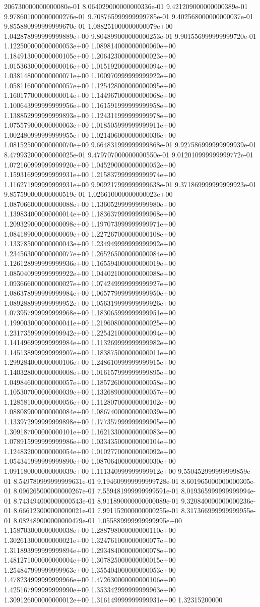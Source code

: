206730000000000080e-01	8.064029000000000336e-01	9.421209000000000389e-01	9.978601000000000276e-01	9.708765999999999785e-01	9.402568000000000037e-01	9.855880999999999670e-01	1.088251000000000079e+00	1.042878999999999889e+00	9.804899000000000253e-01	9.901556999999999720e-01	1.122500000000000053e+00	1.089814000000000060e+00	1.184913000000000105e+00	1.206423000000000023e+00	1.015363000000000016e+00	1.015192000000000094e+00	1.038148000000000071e+00	1.100970999999999922e+00	1.058116000000000057e+00	1.125428000000000095e+00	1.160177000000000014e+00	1.144967000000000068e+00	1.100643999999999956e+00	1.161591999999999958e+00	1.138852999999999893e+00	1.124311999999999978e+00	1.075579000000000063e+00	1.018505999999999911e+00	1.002480999999999955e+00	1.021406000000000036e+00	1.081525000000000070e+00	9.664831999999999868e-01	9.927586999999999939e-01	8.479932000000000025e-01	9.479707000000000550e-01	9.012010999999999772e-01	1.072160999999999920e+00	1.045290000000000052e+00	1.159316999999999931e+00	1.215837999999999974e+00	1.116271999999999931e+00	9.909217999999999638e-01	9.371869999999999923e-01	9.857590000000000519e-01	1.026610000000000023e+00	1.087066000000000088e+00	1.136052999999999980e+00	1.139834000000000014e+00	1.183637999999999968e+00	1.209329000000000098e+00	1.197073999999999971e+00	1.084189000000000069e+00	1.227267000000000108e+00	1.133785000000000043e+00	1.234949999999999992e+00	1.234563000000000077e+00	1.265265000000000084e+00	1.126128999999999936e+00	1.165594000000000019e+00	1.085040999999999922e+00	1.044021000000000088e+00	1.093666000000000027e+00	1.074249999999999927e+00	1.086378999999999984e+00	1.065779999999999950e+00	1.089288999999999952e+00	1.056319999999999926e+00	1.073957999999999968e+00	1.183065999999999951e+00	1.199003000000000041e+00	1.219608000000000025e+00	1.231735999999999942e+00	1.225421000000000094e+00	1.141496999999999984e+00	1.113269999999999982e+00	1.145138999999999907e+00	1.183875000000000011e+00	1.299284000000000106e+00	1.248610999999999915e+00	1.140328000000000008e+00	1.016157999999999895e+00	1.049846000000000057e+00	1.185726000000000058e+00	1.105307000000000039e+00	1.132689000000000057e+00	1.128581000000000056e+00	1.112807000000000102e+00	1.088089000000000084e+00	1.086740000000000039e+00	1.133972999999999898e+00	1.177357999999999905e+00	1.309187000000000101e+00	1.162133000000000083e+00	1.078915999999999986e+00	1.033435000000000104e+00	1.124832000000000054e+00	1.010277000000000092e+00	1.054341999999999890e+00	1.087064000000000030e+00	1.091180000000000039e+00	1.111340999999999912e+00	9.550452999999999859e-01	8.549780999999999631e-01	9.194609999999999728e-01	8.601965000000000305e-01	8.096265000000000267e-01	7.559481999999999591e-01	8.019365999999999994e-01	8.743494000000000543e-01	8.911890000000000089e-01	9.320840000000000236e-01	8.666123000000000021e-01	7.991152000000000255e-01	8.317366999999999955e-01	8.082489000000000479e-01	1.055889999999999995e+00	1.158703000000000038e+00	1.288798000000000110e+00	1.302613000000000021e+00	1.324761000000000077e+00	1.311893999999999894e+00	1.293484000000000078e+00	1.481271000000000004e+00	1.307825000000000015e+00	1.254847999999999963e+00	1.355404000000000053e+00	1.478234999999999966e+00	1.472630000000000106e+00	1.425167999999999990e+00	1.353342999999999963e+00	1.309126000000000012e+00	1.316149999999999931e+00	1.32315200000